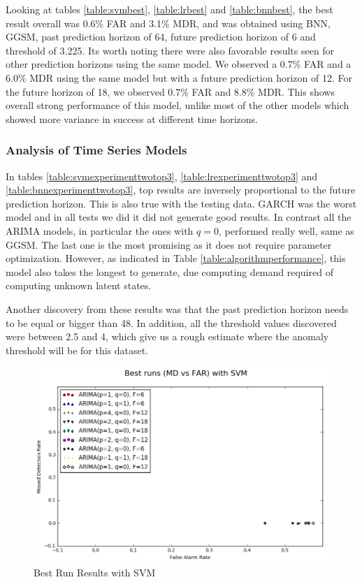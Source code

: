 \documentclass{acm_proc_article-sp}
\begin{document}
Looking at tables \ref{table:svmbest}, \ref{table:lrbest} and \ref{table:bnnbest}, the best result overall was 0.6\% FAR and 3.1\% MDR, and was obtained using BNN, GGSM, past prediction horizon of 64, future prediction horizon of 6 and threshold of 3.225. Its worth  noting there were also favorable results seen for other prediction horizons using the same model. We observed a 0.7\% FAR and a 6.0\% MDR using the same model but with a future prediction horizon of 12. For the future horizon of 18, we observed 0.7\% FAR and 8.8\% MDR. This shows overall strong performance of this model, unlike most of the other models which showed more variance in success at different time horizons.

\subsubsection{Analysis of Time Series Models}
In tables \ref{table:svmexperimenttwotop3}, \ref{table:lrexperimenttwotop3} and \ref{table:bnnexperimenttwotop3}, top results are inversely proportional to the future prediction horizon. This is also true with the testing data.
GARCH was the worst model and in all tests we did it did not generate good results. In contrast all the ARIMA models, in particular the ones with $q=0$, performed really well, same as GGSM. The last one is the most promising  as it does not require parameter optimization. However, as indicated in Table \ref{table:algorithmperformance}, this model also takes the longest to generate, due computing demand required of computing unknown latent states.

Another discovery from these results was that the past prediction horizon needs to be equal or bigger than 48. In addition, all the threshold values discovered were between 2.5 and 4, which give us a rough estimate where the anomaly threshold will be for this dataset.
\vspace{.1in}
\begin{figure}[!h]
\centering
    \includegraphics[scale=0.4]{figures/best_runs_svm.png}
\caption{Best Run Results with SVM} 
\label{fig:svmbest}
\end{figure}
\end{document}
